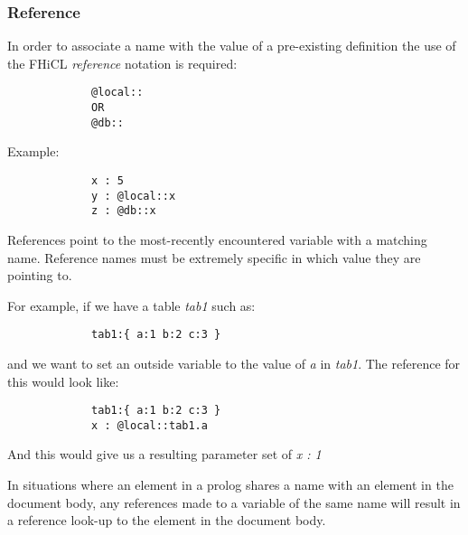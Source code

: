\documentclass{memarticle}
\begin{document}
{                \subsubsection{Reference}
                        In order to associate a name
                        with the value of a pre-existing definition
                        the use of the FHiCL \emph{reference} notation is required:
                        \begin{verbatim}
             @local::
             OR
             @db::
                        \end{verbatim}
                        Example:
                        \begin{verbatim}
             x : 5
             y : @local::x
             z : @db::x
                        \end{verbatim}
                        \par
                        References point to the most-recently encountered variable
                        with a matching name.
                        Reference names must be extremely specific
                        in which value they are pointing to.
                        \par
                        For example, if we have a table \emph{tab1} such as:
                        \begin{verbatim}
             tab1:{ a:1 b:2 c:3 }
                        \end{verbatim}
                        and we want to set an outside variable to the value of \emph{a} in \emph{tab1}.
                        The reference for this would look like:
                        \begin{verbatim}
             tab1:{ a:1 b:2 c:3 }
             x : @local::tab1.a
                        \end{verbatim}
                        And this would give us a resulting parameter set of \emph{x : 1}
                        \par
                        In situations where an element in a prolog shares a name with an element in the document body,
                        any references made to a variable of the same name will result in a reference look-up to the element
                        in the document body.
}
\end{document}
